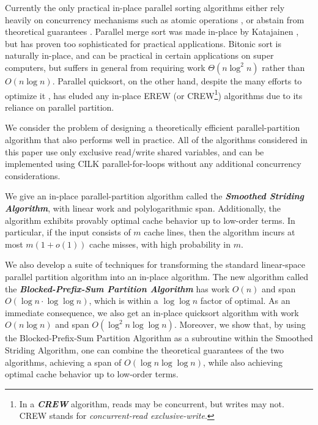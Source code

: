 \documentclass[twoside,leqno,twocolumn]{article}
\newcommand{\defn}[1]{{\textit{\textbf{\boldmath #1}}}}
\renewcommand{\paragraph}[1]{\vspace{0.09in}\noindent{\bf \boldmath #1.}}
\begin{document}
Currently the only practical in-place parallel sorting algorithms either rely
heavily on concurrency mechanisms such as atomic operations
\cite{HeidelbergerNo90, AxtmannWi17, TsigasZh03}, or abstain from
theoretical guarantees \cite{FrancisPa92}. Parallel merge sort
\cite{Hagerup89} was made in-place by Katajainen \cite{Katajainen93},
but has proven too sophisticated for practical applications. Bitonic
sort \cite{BlellochLe98} is naturally in-place, and can be practical
in certain applications on super computers, but suffers in general
from requiring work $\Theta(n \log^2 n)$ rather than $O(n \log
n)$. Parallel quicksort, on the other hand, despite the many efforts
to optimize it \cite{HeidelbergerNo90, AxtmannWi17, TsigasZh03,
  FrancisPa92, Frias08}, has eluded any in-place EREW (or CREW\footnote{In a
  \defn{CREW} algorithm, reads may be concurrent, but writes may
  not. CREW stands for \emph{concurrent-read exclusive-write}.})
algorithms due to its reliance on parallel partition.

\paragraph{Results}
We consider the problem of designing a theoretically efficient
parallel-partition algorithm that also performs well in practice. All
of the algorithms considered in this paper use only exclusive
read/write shared variables, and can be implemented using
CILK parallel-for-loops without any additional concurrency considerations.

We give an in-place parallel-partition algorithm called the
\defn{Smoothed Striding Algorithm}, with linear work and
polylogarithmic span. Additionally, the algorithm exhibits provably
optimal cache behavior up to low-order terms. In particular, if the
input consists of $m$ cache lines, then the algorithm incurs at most
$m(1 + o(1))$ cache misses, with high probability in $m$.

We also develop a suite of techniques for transforming the standard
linear-space parallel partition algorithm into an in-place
algorithm. The new algorithm called the
\defn{Blocked-Prefix-Sum Partition Algorithm} has work $O(n)$ and span
$O(\log n \cdot \log \log n)$, which is within a $\log \log n$ factor
of optimal. As an immediate consequence, we also get an in-place
quicksort algorithm with work $O(n \log n)$ and span
$O(\log^2 n \log \log n)$. Moreover, we show that, by using the
Blocked-Prefix-Sum Partition Algorithm as a subroutine within the
Smoothed Striding Algorithm, one can combine the theoretical
guarantees of the two algorithms, achieving a span of
$O(\log n \log \log n)$, while also achieving optimal cache behavior
up to low-order terms.
\end{document}
